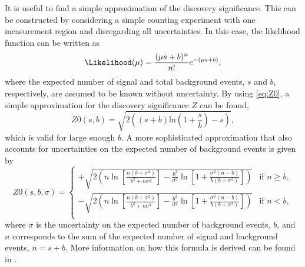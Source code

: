 It is useful to find a simple approximation of the discovery significance. 
This can be constructed by considering a simple counting experiment with one measurement region and disregarding all uncertainties. In this case, the likelihood function can be written as
\begin{equation}
  \Likelihood(\mu) = \frac{(\mu s +b)^n}{n!} e^{-(\mu s+b)},
\end{equation}
where the expected number of signal and total background events, $s$ and $b$, respectively, are assumed to be known without uncertainty.
By using \cref{eq:Z0}, a simple approximation for the discovery significance $Z$ can be found,
\begin{equation}
    \label{eq:discovery-significance}
  Z0(s, b) = \sqrt{2 \left( \left(s + b\right) \text{ln}\left(1 + \frac{s}{b}\right) - s\right)},
\end{equation}
which is valid for large enough $b$.
A more sophisticated approximation that also accounts for uncertainties on the expected number of background events is given by
\begin{equation}
    \label{eq:simple-sign}
    Z0(s, b, \sigma) = 
    \begin{cases}
    + \sqrt{ 2 \left( n \ln \left[ \frac{n \left( b + \sigma^2 \right)}{b^2 + n \sigma^2} \right] - \frac{b^2}{\sigma^2} \ln \left[ 1 + \frac{\sigma^2 \left(n - b \right) }{b \left( b + \sigma ^2 \right) } \right] \right)   } & \text{if } n \geq b, \\
    - \sqrt{ 2 \left( n \ln \left[ \frac{n \left( b + \sigma^2 \right)}{b^2 + n \sigma^2} \right] - \frac{b^2}{\sigma^2} \ln \left[ 1 + \frac{\sigma^2 \left(n - b \right) }{b \left( b + \sigma ^2 \right) } \right] \right)   } & \text{if } n < b, \\
\end{cases}
\end{equation}
where $\sigma$ is the uncertainty on the expected number of background events, $b$, and $n$ corresponds to the sum of the expected number of signal and background events, $n = s+b$.
More information on how this formula is derived can be found in .




